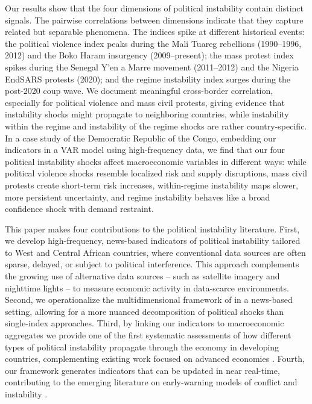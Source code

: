 \documentclass[12pt,a4paper,fleqn]{article}
\begin{document}
Our results show that the four dimensions of political instability contain distinct signals. The pairwise correlations between dimensions indicate that they capture related but separable phenomena. The indices spike at different historical events: the political violence index peaks during the Mali Tuareg rebellions (1990--1996, 2012) and the Boko Haram insurgency (2009--present); the mass protest index spikes during the Senegal Y'en a Marre movement (2011--2012) and the Nigeria EndSARS protests (2020); and the regime instability index surges during the post-2020 coup wave. We document meaningful cross-border correlation, especially for political violence and mass civil protests, giving evidence that instability shocks might propagate to neighboring countries, while instability within the regime and instability of the regime shocks are rather country-specific. In a case study of the Democratic Republic of the Congo, embedding our indicators in a VAR model using high-frequency data, we find that our four political instability shocks affect macroeconomic variables in different ways: while political violence shocks resemble localized risk and supply disruptions, mass civil protests create short-term risk increases, within-regime instability maps slower, more persistent uncertainty, and regime instability behaves like a broad confidence shock with demand restraint. %

This paper makes four contributions to the political instability literature. First, we develop high-frequency, news-based indicators of political instability tailored to West and Central African countries, where conventional data sources are often sparse, delayed, or subject to political interference. This approach complements the growing use of alternative data sources -- such as satellite imagery and nighttime lights \citep{henderson2012, DONALDSON2016} -- to measure economic activity in data-scarce environments. Second, we operationalize the multidimensional framework of \cite{JONGAPIN2009} in a news-based setting, allowing for a more nuanced decomposition of political shocks than single-index approaches. Third, by linking our indicators to %
macroeconomic aggregates %
we provide one of the first systematic assessments of how different types of political instability propagate through the economy in developing countries, complementing existing work focused on advanced economies \citep{DIRKS2024102586}. Fourth, our framework generates indicators that can be updated in near real-time, contributing to the emerging literature on early-warning models of conflict and instability \citep{goldstone2010, hegre2017}.
\end{document}
